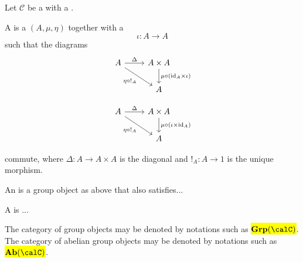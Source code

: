 \begin{definition} \label{definition:group_object_in_a_category_with_a_final_object}
    Let $\mathcal{C}$ be a  with a . 
    
    A  is a  $(A,\mu, \eta)$ together with a  
    $$
    \iota : A \to A
    $$
    such that the diagrams
    $$
    \begin{tikzcd}
    A
    \arrow[r, "\Delta"]
    \arrow[dr, "\eta \circ {!}_A"']
    & A \times A
    \arrow[d, "\mu \circ (\mathrm{id}_A \times \iota)"]
    \\
    & A
    \end{tikzcd}
    $$

    $$
    \begin{tikzcd}
    A
    \arrow[r, "\Delta"]
    \arrow[dr, "\eta \circ {!}_A"']
    & A \times A
    \arrow[d, "\mu \circ (\iota \times \mathrm{id}_A)"]
    \\
    & A
    \end{tikzcd}
    $$

    commute, where $\Delta : A \to A \times A$ is the diagonal and ${!}_A : A \to 1$ is the unique morphism.

    An  is a group object as above that also satisfies... \TODO{}

    A  is ...

    The category of group objects may be denoted by notations such as \hl{$\mathbf{Grp}(\calC)$}. 
    The category of abelian group objects may be denoted by notations such as \hl{$\mathbf{Ab}(\calC)$}. 

\end{definition}